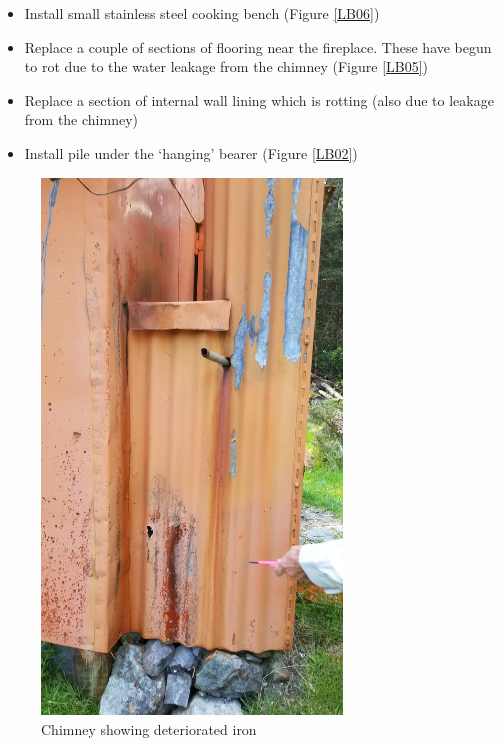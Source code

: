 \documentclass[12pt]{article} %
\begin{document}
\begin{itemize}
 \item Install small stainless steel cooking bench (Figure \ref{LB06})
 \item Replace a couple of sections of flooring near the fireplace.  These have begun to rot due to the water leakage from the chimney (Figure \ref{LB05})
 \item Replace a section of internal wall lining which is rotting (also due to leakage from the chimney)
 \item Install pile under the `hanging' bearer (Figure \ref{LB02})
\end{itemize}
 
\begin{figure}[ht]
\begin{minipage}{.5\linewidth}
\begin{center}
   \includegraphics[width=8cm, angle=270]{LucretiaBivReport23Nov2019Photo3}
   \caption{Chimney showing deteriorated iron}
   \label{LB03}
\end{center}
\end{minipage}
\begin{minipage}{.5\linewidth}
\begin{center}

\end{center}
\end{minipage}
\end{figure}
\end{document}
